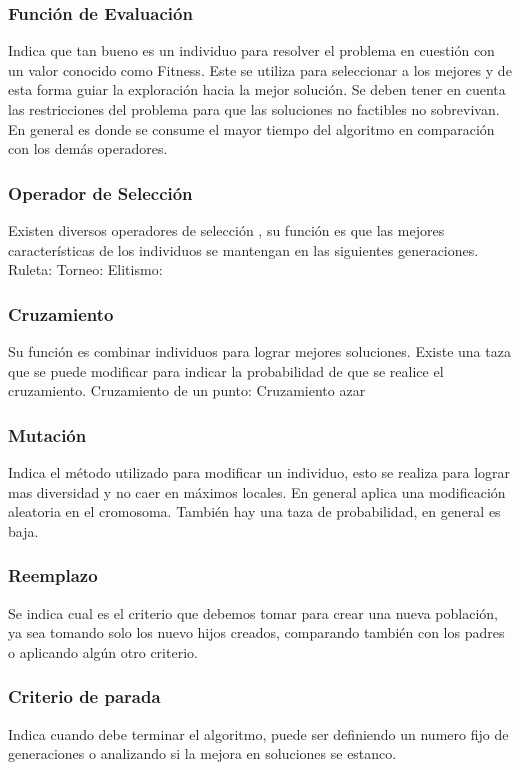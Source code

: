\subsubsection{Función de Evaluación} 
Indica que tan bueno es un individuo para resolver el problema en cuestión con un valor conocido como Fitness. Este se utiliza para seleccionar a los mejores y de esta forma guiar la exploración hacia la mejor solución.
Se deben tener en cuenta las restricciones del problema para que las soluciones no factibles no sobrevivan.
En general es donde se consume el mayor tiempo del algoritmo en comparación con los demás operadores.

\subsubsection{Operador de Selección}
Existen diversos operadores de selección , su función es que las mejores características de los individuos se mantengan en las siguientes generaciones.
Ruleta:
Torneo:
Elitismo:

\subsubsection{Cruzamiento}
Su función es combinar individuos para lograr mejores soluciones. 
Existe una taza que se puede modificar para indicar la probabilidad de que se realice el cruzamiento.
Cruzamiento de un punto:
Cruzamiento azar

\subsubsection{Mutación} 
Indica el método utilizado para modificar un individuo, esto se realiza para lograr mas diversidad y no caer en máximos locales. En general aplica una modificación aleatoria en el cromosoma.
También hay una taza de probabilidad, en general es baja.

\subsubsection{Reemplazo} 
Se indica cual es el criterio que debemos tomar para crear una nueva población, ya sea tomando solo los nuevo hijos creados, comparando también con los padres o aplicando algún otro criterio.

\subsubsection{Criterio de parada} 
Indica cuando debe terminar el algoritmo, puede ser definiendo un numero fijo de generaciones o analizando si la mejora en soluciones se estanco.

